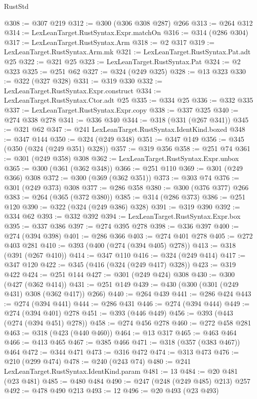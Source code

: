 \begin{lexlean}{RustStd}
\begin{coremodule}
@308 := @307 @219
@312 := @300 (@306 @308 @287) @266
@313 := @264 @312
@314 := LexLeanTarget.RustSyntax.Expr.matchOn
@316 := @314 (@286 @304)
@317 := LexLeanTarget.RustSyntax.Arm
@318 := @2 @317
@319 := LexLeanTarget.RustSyntax.Arm.mk
@321 := LexLeanTarget.RustSyntax.Pat.adt @25
@322 := @321 @25
@323 := LexLeanTarget.RustSyntax.Pat
@324 := @2 @323
@325 := @251 @62
@327 := @324 (@249 @325)
@328 := @13 @323
@330 := @322 (@327 @328)
@331 := @319 @330
@332 := LexLeanTarget.RustSyntax.Expr.construct
@334 := LexLeanTarget.RustSyntax.Ctor.adt @25
@335 := @334 @25
@336 := @332 @335
@337 := LexLeanTarget.RustSyntax.Expr.copy
@338 := @337 @325
@340 := @274 @338 @278
@341 := @336 @340
@344 := @318 (@331 (@267 @341))
@345 := @321 @62
@347 := @241 LexLeanTarget.RustSyntax.IdentKind.boxed
@348 := @347 @144
@350 := @324 (@249 @348)
@351 := @347 @149
@356 := @345 (@350 (@324 (@249 @351) @328))
@357 := @319 @356
@358 := @251 @74
@361 := @301 (@249 @358) @308
@362 := LexLeanTarget.RustSyntax.Expr.unbox
@365 := @300 (@361 (@362 @348))
@366 := @251 @110
@369 := @301 (@249 @366) @308
@372 := @300 (@369 (@362 @351))
@373 := @303 @74
@376 := @301 (@249 @373) @308
@377 := @286 @358
@380 := @300 (@376 @377) @266
@383 := @264 (@365 (@372 @380))
@385 := @314 (@286 @373)
@386 := @251 @120
@390 := @322 (@324 (@249 @386) @328)
@391 := @319 @390
@392 := @334 @62
@393 := @332 @392
@394 := LexLeanTarget.RustSyntax.Expr.box
@395 := @337 @386
@397 := @274 @395 @278
@398 := @336 @397
@400 := @274 (@394 @398)
@401 := @286 @366
@403 := @274 @401 @278
@405 := @272 @403 @281
@410 := @393 (@400 (@274 (@394 @405) @278))
@413 := @318 (@391 (@267 @410))
@414 := @347 @110
@416 := @324 (@249 @414)
@417 := @347 @120
@422 := @345 (@416 (@324 (@249 @417) @328))
@423 := @319 @422
@424 := @251 @144
@427 := @301 (@249 @424) @308
@430 := @300 (@427 (@362 @414))
@431 := @251 @149
@439 := @430 (@300 (@301 (@249 @431) @308 (@362 @417)) @266)
@440 := @264 @439
@441 := @286 @424
@443 := @274 (@394 @441)
@444 := @286 @431
@446 := @274 (@394 @444)
@449 := @274 (@394 @401) @278
@451 := @393 (@446 @449)
@456 := @393 (@443 (@274 (@394 @451) @278))
@458 := @274 @456 @278
@460 := @272 @458 @281
@463 := @318 (@423 (@440 @460))
@464 := @13 @317
@465 := @463 @464
@466 := @413 @465
@467 := @385 @466
@471 := @318 (@357 (@383 @467)) @464
@472 := @344 @471
@473 := @316 @472
@474 := @313 @473
@476 := @210 (@299 @474)
@478 := @240 (@243 @74)
@480 := @241 LexLeanTarget.RustSyntax.IdentKind.param
@481 := 13
@484 := @20 @481 (@23 @481)
@485 := @480 @484
@490 := @247 (@248 (@249 @485) @213) @257
@492 := @478 @490 @213
@493 := 12
@496 := @20 @493 (@23 @493)

\end{coremodule}
\end{lexlean}
